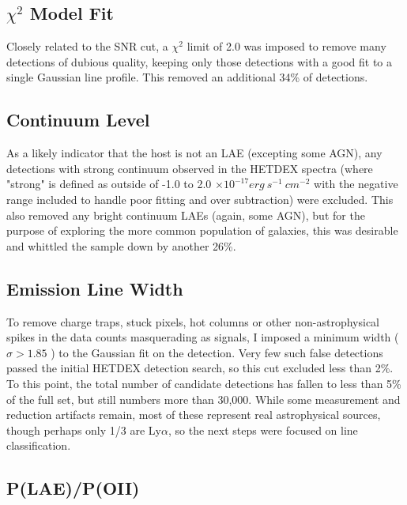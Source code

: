 \documentclass{aastex62}
\begin{document}
\subsection{$\chi^{2}$ Model Fit}
Closely related to the SNR cut, a $\chi^{2}$ limit of 2.0 was imposed to remove many detections of dubious quality, keeping only those detections with a good fit to a single Gaussian line profile. This removed an additional 34\% of detections.\\

\subsection{Continuum Level}
As a likely indicator that the host is not an LAE (excepting some AGN), any detections with strong continuum observed in the HETDEX spectra (where "strong" is defined as outside of -1.0 to 2.0 $\times 10^{-17} erg\ s^{-1}\ cm^{-2}$ with the negative range included to handle poor fitting and over subtraction) were excluded. This also removed any bright continuum LAEs (again, some AGN), but for the purpose of exploring the more common population of galaxies, this was desirable and whittled the sample down by another 26\%. \\

\subsection{Emission Line Width}
To remove charge traps, stuck pixels, hot columns or other non-astrophysical spikes in the data counts masquerading as signals, I imposed a minimum width ($\sigma > 1.85$ ) to the Gaussian fit on the detection. Very few such false detections passed the initial HETDEX detection search, so this cut excluded less than 2\%. \\

To this point, the total number of candidate detections has fallen to less than 5\% of the full set, but still numbers more than 30,000. While some measurement and reduction artifacts remain, most of these represent real astrophysical sources, though perhaps only 1/3 are Ly$\alpha$, so the next steps were focused on line classification. \\


\subsection{P(LAE)/P(OII)}
\end{document}
